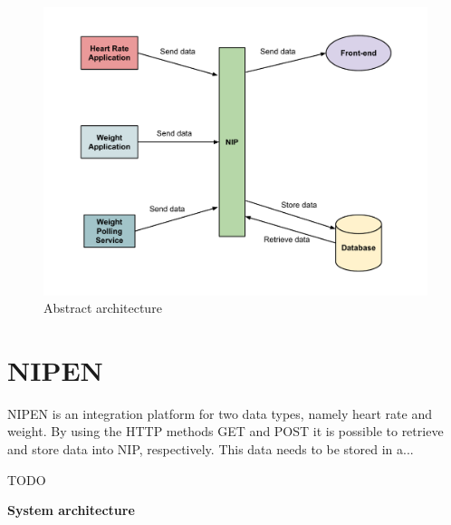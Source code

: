 \begin{figure}[h]
\centering
\includegraphics[scale=0.5]{../Figures/abstract-architecture.pdf}
\caption{Abstract architecture}
\label{figure:abstract-architecture}
\end{figure}

\section{NIPEN}

NIPEN is an integration platform for two data types, namely heart rate and weight.
By using the HTTP methods GET and POST it is possible to retrieve and store data into NIP, respectively.
This data needs to be stored in a... 

TODO

\textbf{System architecture}


